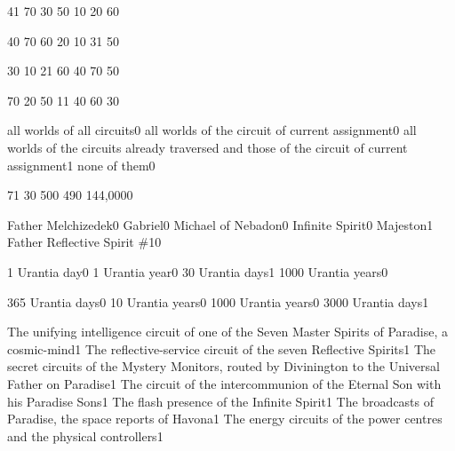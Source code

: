 {4}{1}
{7}{0}
{3}{0}
{5}{0}
{1}{0}
{2}{0}
{6}{0}
\qstop

{4}{0}
{7}{0}
{6}{0}
{2}{0}
{1}{0}
{3}{1}
{5}{0}
\qstop

{3}{0}
{1}{0}
{2}{1}
{6}{0}
{4}{0}
{7}{0}
{5}{0}
\qstop

{7}{0}
{2}{0}
{5}{0}
{1}{1}
{4}{0}
{6}{0}
{3}{0}
\qstop

{all worlds of all circuits}{0}
{all worlds of the circuit of current assignment}{0}
{all worlds of the circuits already traversed and those of the circuit of current assignment}{1}
{none of them}{0}
\qstop


{7}{1}
{3}{0}
{50}{0}
{49}{0}
{144,000}{0}
\qstop

{Father Melchizedek}{0}
{Gabriel}{0}
{Michael of Nebadon}{0}
{Infinite Spirit}{0}
{Majeston}{1}
{Father Reflective Spirit \#1}{0}
\qstop

{1 Urantia day}{0}
{1 Urantia year}{0}
{30 Urantia days}{1}
{1000 Urantia years}{0}
\qstop

{365 Urantia days}{0}
{10 Urantia years}{0}
{1000 Urantia years}{0}
{3000 Urantia days}{1}
\qstop

{The unifying intelligence circuit of one of the Seven Master Spirits of Paradise, a cosmic-mind}{1}
{The reflective-service circuit of the seven Reflective Spirits}{1}
{The secret circuits of the Mystery Monitors, routed by Divinington to the Universal Father on Paradise}{1}
{The circuit of the intercommunion of the Eternal Son with his Paradise Sons}{1}
{The flash presence of the Infinite Spirit}{1}
{The broadcasts of Paradise, the space reports of Havona}{1}
{The energy circuits of the power centres and the physical controllers}{1}
\qstop

